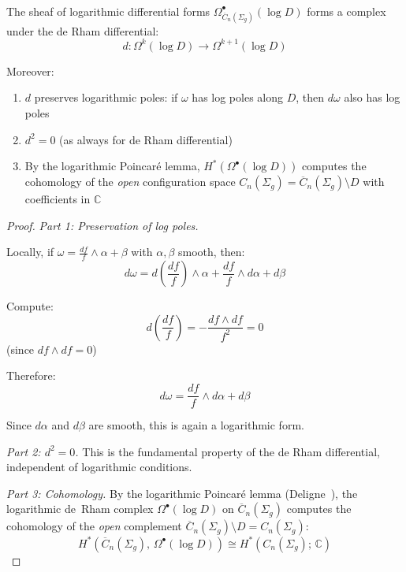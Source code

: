 \begin{theorem}\label{thm:log-complex}
\leavevmode\\
The sheaf of logarithmic differential forms
$\Omega^\bullet_{\overline{C}_n(\Sigma_g)}(\log D)$
forms a complex under the de Rham differential:
\[d: \Omega^k(\log D) \to \Omega^{k+1}(\log D)\]

Moreover:
\begin{enumerate}
\item $d$ preserves logarithmic poles: if $\omega$ has log poles along $D$, then $d\omega$ also has log poles
\item $d^2 = 0$ (as always for de Rham differential)
\item By the logarithmic Poincar\'e lemma, $H^*(\Omega^\bullet(\log D))$ computes the cohomology of the \emph{open} configuration space $C_n(\Sigma_g) = \overline{C}_n(\Sigma_g) \setminus D$ with coefficients in $\mathbb{C}$
\end{enumerate}
\end{theorem}

\begin{proof}
\emph{Part 1: Preservation of log poles.}

Locally, if $\omega = \frac{df}{f} \wedge \alpha + \beta$ with $\alpha, \beta$ smooth, then:
\[d\omega = d\left(\frac{df}{f}\right) \wedge \alpha + \frac{df}{f} \wedge d\alpha + d\beta\]

Compute:
\[d\left(\frac{df}{f}\right) = -\frac{df \wedge df}{f^2} = 0\]
(since $df \wedge df = 0$)

Therefore:
\[d\omega = \frac{df}{f} \wedge d\alpha + d\beta\]

Since $d\alpha$ and $d\beta$ are smooth, this is again a logarithmic form.

\emph{Part 2: $d^2 = 0$.}
This is the fundamental property of the de Rham differential, independent of logarithmic conditions.

\emph{Part 3: Cohomology.}
By the logarithmic Poincar\'{e} lemma (Deligne~\cite{Deligne71}), the logarithmic de~Rham complex $\Omega^\bullet(\log D)$ on $\overline{C}_n(\Sigma_g)$ computes the cohomology of the \emph{open} complement $\overline{C}_n(\Sigma_g) \setminus D = C_n(\Sigma_g)$:
\[H^*(\overline{C}_n(\Sigma_g),\, \Omega^\bullet(\log D)) \cong H^*(C_n(\Sigma_g);\, \mathbb{C})\]
\end{proof}

